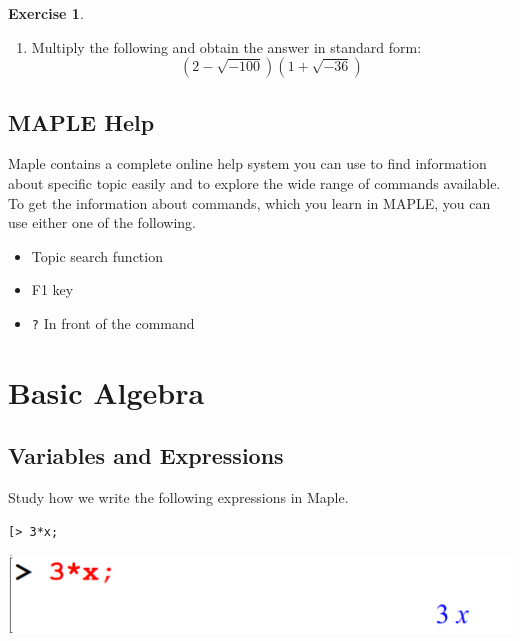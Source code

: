 \documentclass[
]{book}
\providecommand{\tightlist}{%
  \setlength{\itemsep}{0pt}\setlength{\parskip}{0pt}}
\theoremstyle{definition}
\theoremstyle{definition}
\theoremstyle{definition}
\newtheorem{exercise}{Exercise}[chapter]
\theoremstyle{definition}
\theoremstyle{remark}
\begin{document}
\begin{exercise}
\protect\hypertarget{exr:unnamed-chunk-12}{}\label{exr:unnamed-chunk-12}\leavevmode

\begin{enumerate}
\def\labelenumi{\arabic{enumi}.}
\setcounter{enumi}{2}
\tightlist
\item
  Multiply the following and obtain the answer in standard form:
  \[(2 − \sqrt{−100})(1 + \sqrt{−36})\]
\end{enumerate}

\end{exercise}

\section{MAPLE Help}\label{maple-help}

Maple contains a complete online help system you can use to find information about specific topic easily and to explore the wide range of commands available. To get the information about commands, which you learn in MAPLE, you can use either one of the following.

\begin{itemize}
\tightlist
\item
  Topic search function
\item
  F1 key
\item
  \texttt{?} In front of the command
\end{itemize}

\chapter{Basic Algebra}\label{basic-algebra}

\section{Variables and Expressions}\label{variables-and-expressions}

Study how we write the following expressions in Maple.

\begin{verbatim}
[> 3*x;
\end{verbatim}

\includegraphics{figures/Lesson 1/fig50.png}
\end{document}
